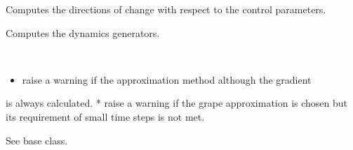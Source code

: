 \documentclass[letterpaper,10pt,english]{sphinxmanual}
\begin{document}
\begin{fulllineitems}
\begin{fulllineitems}
Computes the directions of change with respect to the control
parameters.

\end{fulllineitems}



\begin{fulllineitems}
Computes the dynamics generators.

\end{fulllineitems}



\begin{fulllineitems}
~\begin{itemize}
\item {} 
raise a warning if the approximation method although the gradient

\end{itemize}

is always calculated.
* raise a warning if the grape approximation is chosen but its
requirement of small time steps is not met.

\end{fulllineitems}


\begin{fulllineitems}
\label{\detokenize{qsim:qsim.solver_algorithms.SchroedingerSolver.set_optimization_parameters}}
See base class.

\end{fulllineitems}


\end{fulllineitems}

\end{document}
